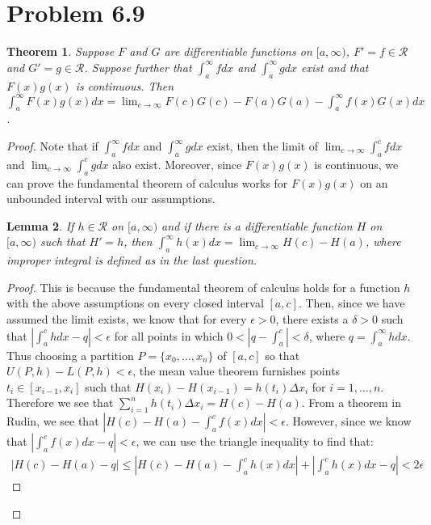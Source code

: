 \documentclass[psamsfonts]{amsart}
\newtheorem{thm}{Theorem}[section]
\newtheorem{lem}[thm]{Lemma}
\theoremstyle{definition}
\theoremstyle{remark}
\numberwithin{equation}{section}
\begin{document}
\section{Problem 6.9}

\begin{thm}
Suppose $F$ and $G$ are differentiable functions on $[a,\infty)$, $F' = f \in \mathscr{R}$ and $G' = g \in \mathscr{R}$. Suppose further that $\int_a^\infty f dx$ and $\int_a^\infty g dx$ exist and that $F(x)g(x)$ is continuous. Then $\int_a^\infty F(x) g(x) dx = \lim_{c \to \infty} F(c) G(c) - F(a) G(a) - \int_a^\infty f(x) G(x) dx$.
\end{thm}

\begin{proof}
Note that if $\int_a^\infty f dx$ and $\int_a^\infty g dx$ exist, then the limit of $\lim_{c \to \infty} \int_a^c f dx$ and $\lim_{c \to \infty} \int_a^c g dx$ also exist. Moreover, since $F(x)g(x)$ is continuous, we can prove the fundamental theorem of calculus works for $F(x)g(x)$ on an unbounded interval with our assumptions.

\begin{lem}
If $h \in \mathscr{R}$ on $[a, \infty)$ and if there is a differentiable function $H$ on $[a,\infty)$ such that $H' = h$, then $\int_a^\infty h(x) dx = \lim_{c \to \infty} H(c) - H(a)$, where improper integral is defined as in the last question. 
\end{lem}

\begin{proof}
This is because the fundamental theorem of calculus holds for a function $h$ with the above assumptions on every closed interval $[a,c]$. Then, since we have assumed the limit exists, we know that for every $\epsilon > 0$, there exists a $\delta > 0$ such that $|\int_a^c h dx - q| < \epsilon$ for all points in which $0 < |q - \int_a^c | < \delta$, where $q = \int_a^\infty h dx$. Thus choosing a partition $P = \{x_0, \ldots, x_n \}$ of $[a,c]$ so that $U(P,h) - L(P,h) < \epsilon$, the mean value theorem furnishes points $t_i \in [x_{i-1}, x_i]$ such that $H(x_i) - H(x_{i-1}) = h(t_i) \Delta x_i$ for $i = 1,\ldots,n$. Therefore we see that $\sum_{i=1}^n h(t_i) \Delta x_i = H(c) - H(a)$. From a theorem in Rudin, we see that $|H(c) - H(a) - \int_a^c f(x) dx | < \epsilon$. However, since we know that $|\int_a^c f(x) dx - q | < \epsilon$, we can use the triangle inequality to find that:
\begin{eqnarray}
|H(c) - H(a) - q| \leq \left|H(c) - H(a) - \int_a^c h (x) dx \right| + \left| \int_a^c h(x) dx - q \right| < 2 \epsilon
\end{eqnarray}


\end{proof}
\end{proof}
\end{document}
